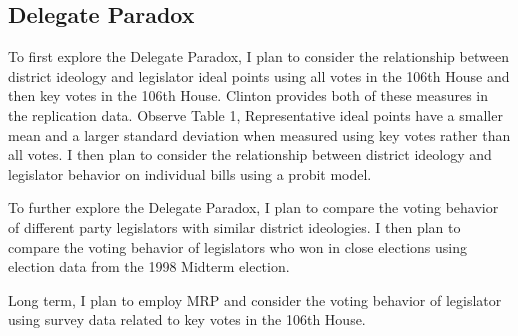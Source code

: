 \documentclass[10pt,letterpaper]{article}
\begin{document}
\newpage

\subsection{Delegate Paradox}
To first explore the Delegate Paradox, I plan to consider the relationship between district ideology and legislator ideal points using all votes in the 106th House and then key votes in the 106th House. Clinton provides both of these measures in the replication data. Observe Table 1, Representative ideal points have a smaller mean and a larger standard deviation when measured using key votes rather than all votes. I then plan to consider the relationship between district ideology and legislator behavior on individual bills using a probit model.

To further explore the Delegate Paradox, I plan to compare the voting behavior of different party legislators with similar district ideologies. I then plan to compare the voting behavior of legislators who won in close elections using election data from the 1998 Midterm election.

Long term, I plan to employ MRP and consider the voting behavior of legislator using survey data related to key votes in the 106th House.

\newpage




% 
\end{document}
